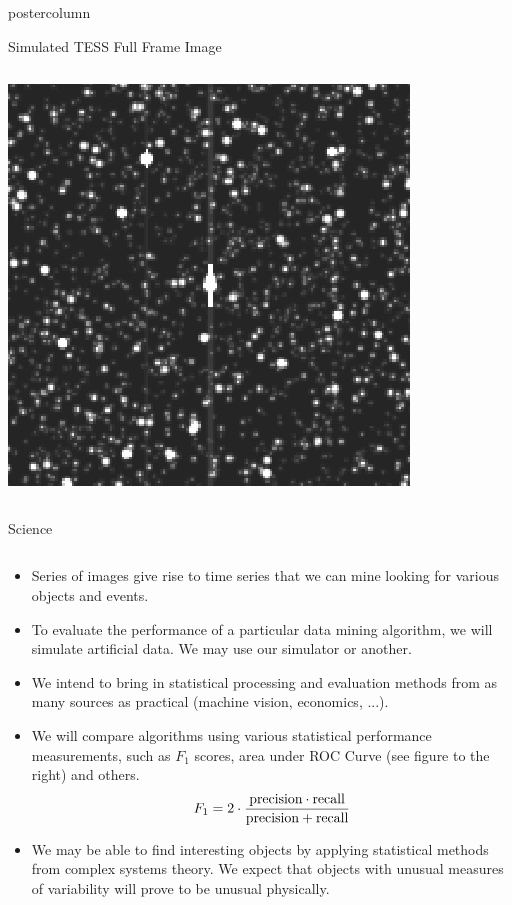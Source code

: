 \documentclass[final,hyperref={pdfpagelabels=false}]{beamer}
\begin{document}
\begin{frame}
\begin{columns}
\begin{column}{.49\textwidth}
\begin{beamercolorbox}[center,wd=\textwidth]{postercolumn}
\begin{minipage}[T]{.95\textwidth}
{\begin{block}{Simulated TESS Full Frame Image}
\begin{columns}
\begin{column}{.28\textwidth}
                  \includegraphics[width=0.80\linewidth]{figures/ffi_simulation.jpg}
		\end{column}
	       \end{columns}
            \end{block}
            \vspace{1cm}
            \begin{block}{Science}
            	\begin{columns}
	                	\begin{column}{.70\textwidth}
		            	\begin{itemize}
					\item Series of images give rise to time series that we can mine looking for various objects and events.
					\item To evaluate the performance of a particular data mining algorithm, we will simulate artificial data. We may use our simulator or another.
					\item We intend to bring in statistical processing and evaluation methods from as many sources as practical (machine vision, economics, ...).
					\item We will compare algorithms using various statistical performance measurements, such as $F_1$ scores, area under ROC Curve (see figure to the right) and others.
					$$ F_1 = 2 \cdot \frac{\textup{precision} \cdot \textup{recall}}{\textup{precision} + \textup{recall}} $$
					\item We may be able to find interesting objects by applying statistical methods from complex systems theory. We expect that objects with unusual measures of variability will prove to be unusual physically.

\end{itemize}
\end{column}
\end{columns}
\end{block}}
\end{minipage}
\end{beamercolorbox}
\end{column}
\end{columns}
\end{frame}
\end{document}
